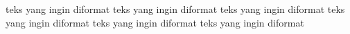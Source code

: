 \tiny{teks yang ingin diformat}
\scriptsize{teks yang ingin diformat}
\footnotesize{teks yang ingin diformat} 
\small{teks yang ingin diformat}
\large{teks yang ingin diformat}
\huge{teks yang ingin diformat}
